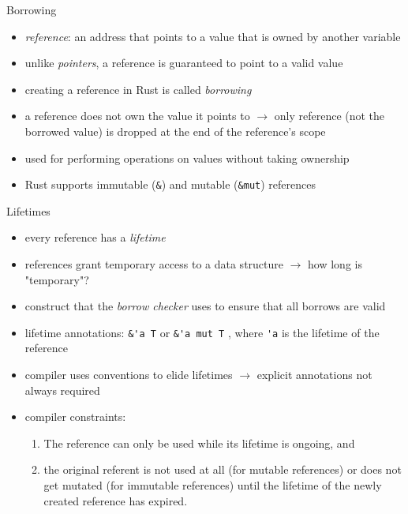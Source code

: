 \documentclass{beamer}
\begin{document}
\begin{frame}[fragile]{Borrowing}
\begin{itemize}
  \item \emph{reference}: an address that points to a value that is owned by another variable
  \item unlike \emph{pointers}, a reference is guaranteed to point to a valid value
  \item creating a reference in Rust is called \emph{borrowing}
  \item a reference does not own the value it points to $\rightarrow$ only reference (not the borrowed value) is dropped at the end of the reference's scope
  \item used for performing operations on values without taking ownership
  \item Rust supports immutable (\verb|&|) and mutable (\verb|&mut|) references
\end{itemize}
\end{frame}


\begin{frame}[fragile]{Lifetimes}
\begin{itemize}
  \item every reference has a \emph{lifetime}
  \item references grant temporary access to a data structure $\rightarrow$ how long is "temporary"?
  \item construct that the \emph{borrow checker} uses to ensure that all borrows are valid
  \item lifetime annotations: \verb|&'a T| or \verb|&'a mut T| , where \verb|'a| is the lifetime of the reference
  \item compiler uses conventions to elide lifetimes $\rightarrow$ explicit annotations not always required
  \item compiler constraints:
  \begin{enumerate}
    \item The reference can only be used while its lifetime is ongoing, and
    \item the original referent is not used at all (for mutable references) or does not get mutated (for immutable references) until the lifetime of the newly created reference has expired.
  \end{enumerate}
\end{itemize}
\end{frame}
\end{document}
